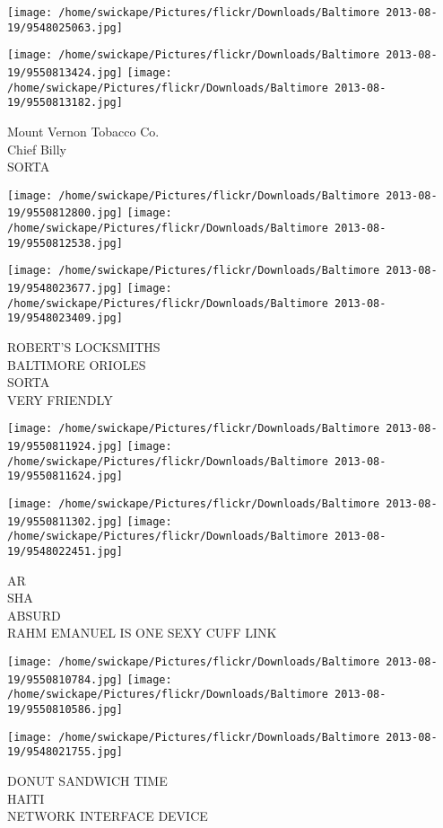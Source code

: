 \documentclass[10pt,letterpaper]{article}
\begin{document}
\texttt{[image: /home/swickape/Pictures/flickr/Downloads/Baltimore 2013-08-19/9548025063.jpg]}

\vspace{0.25in}
\texttt{[image: /home/swickape/Pictures/flickr/Downloads/Baltimore 2013-08-19/9550813424.jpg]}
\texttt{[image: /home/swickape/Pictures/flickr/Downloads/Baltimore 2013-08-19/9550813182.jpg]}

Mount Vernon Tobacco Co.\\
Chief Billy\\
SORTA
\pagebreak

\texttt{[image: /home/swickape/Pictures/flickr/Downloads/Baltimore 2013-08-19/9550812800.jpg]}
\texttt{[image: /home/swickape/Pictures/flickr/Downloads/Baltimore 2013-08-19/9550812538.jpg]}

\texttt{[image: /home/swickape/Pictures/flickr/Downloads/Baltimore 2013-08-19/9548023677.jpg]}
\texttt{[image: /home/swickape/Pictures/flickr/Downloads/Baltimore 2013-08-19/9548023409.jpg]}

ROBERT'S LOCKSMITHS\\
BALTIMORE ORIOLES\\
SORTA\\
VERY FRIENDLY
\pagebreak

\texttt{[image: /home/swickape/Pictures/flickr/Downloads/Baltimore 2013-08-19/9550811924.jpg]}
\texttt{[image: /home/swickape/Pictures/flickr/Downloads/Baltimore 2013-08-19/9550811624.jpg]}

\texttt{[image: /home/swickape/Pictures/flickr/Downloads/Baltimore 2013-08-19/9550811302.jpg]}
\texttt{[image: /home/swickape/Pictures/flickr/Downloads/Baltimore 2013-08-19/9548022451.jpg]}

AR\\
SHA\\
ABSURD\\
RAHM EMANUEL IS ONE SEXY CUFF LINK
\pagebreak

\texttt{[image: /home/swickape/Pictures/flickr/Downloads/Baltimore 2013-08-19/9550810784.jpg]}
\texttt{[image: /home/swickape/Pictures/flickr/Downloads/Baltimore 2013-08-19/9550810586.jpg]}

\texttt{[image: /home/swickape/Pictures/flickr/Downloads/Baltimore 2013-08-19/9548021755.jpg]}

DONUT SANDWICH TIME\\
HAITI\\
NETWORK INTERFACE DEVICE
\pagebreak
\end{document}

